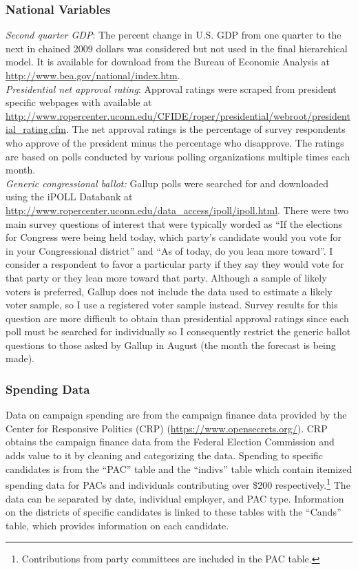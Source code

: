 \documentclass[12pt,final,fleqn]{article}
\theoremstyle{plain}
\begin{document}
\subsubsection{National Variables}
\emph{Second quarter GDP}: The percent change in U.S. GDP from one quarter to the next in chained 2009 dollars was considered but not used in the final hierarchical model. It is available for download from the Bureau of Economic Analysis at \url{http://www.bea.gov/national/index.htm}. \\
\emph{Presidential net approval rating}: Approval ratings were scraped from president specific webpages with available at \url{http://www.ropercenter.uconn.edu/CFIDE/roper/presidential/webroot/presidential_rating.cfm}. The net approval ratings is the percentage of survey respondents who approve of the president minus the percentage who disapprove. The ratings are based on polls conducted by various polling organizations multiple times each month. \\
\emph{Generic congressional ballot:} Gallup polls were searched for and downloaded using the iPOLL Databank at \url{http://www.ropercenter.uconn.edu/data_access/ipoll/ipoll.html}. There were two main survey questions of interest that were typically worded as ``If the elections for Congress were being held today, which party's candidate would you vote for in your 
Congressional district'' and ``As of today, do you lean more toward''. I consider a respondent to favor a particular party if they say they would vote for that party or they lean more toward that party. Although a sample of likely voters is preferred, Gallup does not include the data used to estimate a likely voter sample, so I use a registered voter sample instead. Survey results for this question are more difficult to obtain than presidential approval ratings since each poll must be searched for individually so I consequently restrict the generic ballot questions to those asked by Gallup in August (the month the forecast is being made).

\subsubsection{Spending Data}
Data on campaign spending are from the campaign finance data provided by the Center for Responsive Politics (CRP) (\url{https://www.opensecrets.org/}). CRP obtains the campaign finance data from the Federal Election Commission and adds value to it by cleaning and categorizing the data. Spending to specific candidates is from the ``PAC'' table and the ``indivs'' table which contain itemized spending data for PACs and individuals contributing over \$200 respectively.\footnote{Contributions from party committees are included in the PAC table.} The data can be separated by date, individual employer, and PAC type. Information on the districts of specific candidates is linked to these tables with the ``Cands'' table, which provides information on each candidate. 
\end{document}
